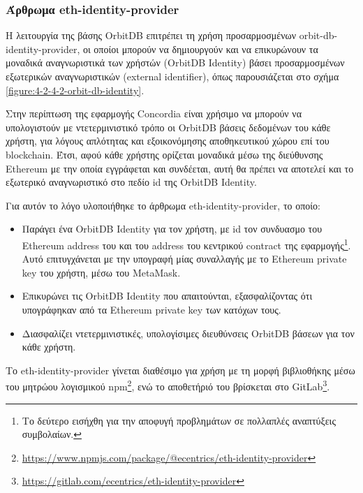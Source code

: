 \subsubsection{Άρθρωμα eth-identity-provider} \label{subsubsection:4-3-1-3-eth-identity-provider-module}

Η λειτουργία της βάσης OrbitDB επιτρέπει τη χρήση προσαρμοσμένων  orbit-db-identity-provider, οι οποίοι μπορούν να δημιουργούν και να επικυρώνουν
τα μοναδικά αναγνωριστικά των χρήστών (OrbitDB Identity) βάσει προσαρμοσμένων εξωτερικών αναγνωριστικών (external identifier), όπως παρουσιάζεται στο σχήμα \ref{figure:4-2-4-2-orbit-db-identity}.

Στην περίπτωση της εφαρμογής Concordia είναι χρήσιμο να μπορούν να υπολογιστούν με ντετερμινιστικό τρόπο οι OrbitDB βάσεις δεδομένων του κάθε χρήστη, για λόγους απλότητας και εξοικονόμησης αποθηκευτικού χώρου επί του blockchain. Έτσι, αφού κάθε χρήστης ορίζεται μοναδικά μέσω της διεύθυνσης Ethereum με την οποία εγγράφεται και συνδέεται, αυτή θα πρέπει να αποτελεί και το εξωτερικό αναγνωριστικό στο πεδίο id της OrbitDB Identity.

\newpage
Για αυτόν το λόγο υλοποιήθηκε το άρθρωμα eth-identity-provider, το οποίο:

\begin{itemize}
	\item Παράγει ένα OrbitDB Identity για τον χρήστη, με id τον συνδυασμο του Ethereum address του και του address του κεντρικού contract της εφαρμογής\footnote{Το δεύτερο εισήχθη για την αποφυγή προβλημάτων σε πολλαπλές αναπτύξεις συμβολαίων.}. Αυτό επιτυγχάνεται με την υπογραφή μίας συναλλαγής με το Ethereum private key του χρήστη, μέσω του MetaMask.
	\item Επικυρώνει τις OrbitDB Identity που απαιτούνται, εξασφαλίζοντας ότι υπογράφηκαν από τα Ethereum private key των κατόχων τους. 
	\item Διασφαλίζει ντετερμινιστικές, υπολογίσιμες διευθύνσεις OrbitDB βάσεων για τον κάθε χρήστη.
\end{itemize}

Το eth-identity-provider γίνεται διαθέσιμο για χρήση με τη μορφή βιβλιοθήκης μέσω του μητρώου λογισμικού npm\footnote{\url{https://www.npmjs.com/package/@ecentrics/eth-identity-provider}}, ενώ το αποθετήριό του βρίσκεται στο GitLab\footnote{\url{https://gitlab.com/ecentrics/eth-identity-provider}}.
